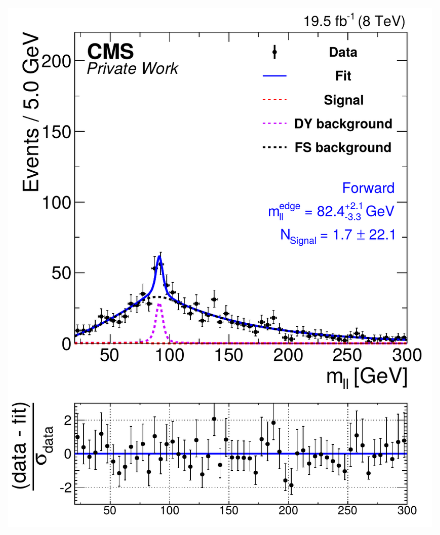 \begin{figure}[!hbp]
\begin{minipage}[t]{0.49\textwidth}
    \includegraphics[width=\textwidth]{plots/results/fit/fit2012_ETHTriangle_SignalInclusive_Combined_Full2012_ETHTriangle_Forward.pdf}
  \end{minipage}
  \begin{minipage}[t]{0.49\textwidth}

\end{minipage}
\end{figure}
